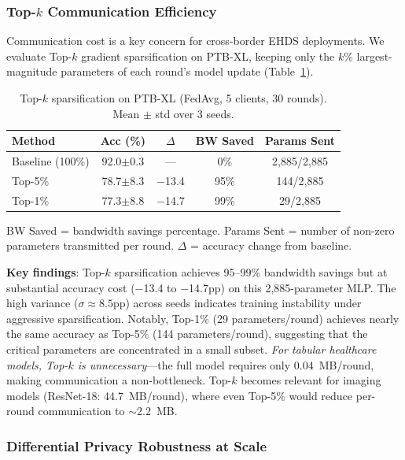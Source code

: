 \documentclass[conference]{IEEEtran}
\begin{document}
\subsubsection{Top-$k$ Communication Efficiency}
\label{sec:topk_results}

Communication cost is a key concern for cross-border EHDS deployments. We evaluate Top-$k$ gradient sparsification on PTB-XL, keeping only the $k$\% largest-magnitude parameters of each round's model update (Table~\ref{tab:topk_ptbxl}).

\begin{table}[htbp]
\centering
\caption{Top-$k$ sparsification on PTB-XL (FedAvg, 5 clients, 30 rounds). Mean $\pm$ std over 3 seeds.}
\label{tab:topk_ptbxl}
\small
\begin{tabular}{lcccc}
\toprule
\textbf{Method} & \textbf{Acc (\%)} & \textbf{$\Delta$} & \textbf{BW Saved} & \textbf{Params Sent} \\
\midrule
Baseline (100\%) & 92.0{\tiny$\pm$0.3} & --- & 0\% & 2,885/2,885 \\
Top-5\% & 78.7{\tiny$\pm$8.3} & $-$13.4 & 95\% & 144/2,885 \\
Top-1\% & 77.3{\tiny$\pm$8.8} & $-$14.7 & 99\% & 29/2,885 \\
\bottomrule
\end{tabular}

\vspace{1mm}
\footnotesize{BW Saved = bandwidth savings percentage. Params Sent = number of non-zero parameters transmitted per round. $\Delta$ = accuracy change from baseline.}
\end{table}

\textbf{Key findings}: Top-$k$ sparsification achieves 95--99\% bandwidth savings but at substantial accuracy cost ($-$13.4 to $-$14.7pp) on this 2,885-parameter MLP. The high variance ($\sigma \approx 8.5$pp) across seeds indicates training instability under aggressive sparsification. Notably, Top-1\% (29 parameters/round) achieves nearly the same accuracy as Top-5\% (144 parameters/round), suggesting that the critical parameters are concentrated in a small subset. \textit{For tabular healthcare models, Top-$k$ is unnecessary}---the full model requires only 0.04~MB/round, making communication a non-bottleneck. Top-$k$ becomes relevant for imaging models (ResNet-18: 44.7~MB/round), where even Top-5\% would reduce per-round communication to $\sim$2.2~MB.

\subsubsection{Differential Privacy Robustness at Scale}
\label{sec:dp_at_scale}
\end{document}
